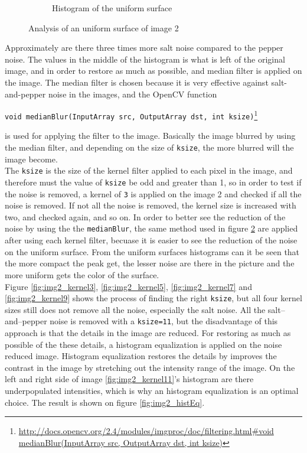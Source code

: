 \begin{figure}[H]
\begin{subfigure}[b]{0.43\textwidth}
        \caption{Histogram of the uniform surface}
        \label{fig:hist_rect_org_img2}
    \end{subfigure}
    \caption{Analysis of an uniform surface of image 2}\label{fig:img2_rect}
\end{figure}

Approximately are there three times more salt noise compared to the pepper noise. The values in the middle of the histogram is what is left of the original image, and in order to restore as much as possible, and median filter is applied on the image. The median filter is chosen because it is very effective against salt-and-pepper noise in the images, and the OpenCV function
\begin{center}
\lstinline|void medianBlur(InputArray src, OutputArray dst, int ksize)|\footnote{\url{http://docs.opencv.org/2.4/modules/imgproc/doc/filtering.html\#void medianBlur(InputArray src, OutputArray dst, int ksize)}}
\end{center}
is used for applying the filter to the image. Basically the image blurred by using the median filter, and depending on the size of \lstinline|ksize|, the more blurred will the image become.\\[0.2cm]
The \lstinline|ksize| is the size of the kernel filter applied to each pixel in the image, and therefore must the value of \lstinline|ksize| be odd and greater than 1, so in order to test if the noise is removed, a kernel of \lstinline|3| is applied on the image 2 and checked if all the noise is removed. If not all the noise is removed, the kernel size is increased with two, and checked again, and so on. In order to better see the reduction of the noise by using the the \lstinline|medianBlur|, the same method used in figure \ref{fig:img2_rect} are applied after using each kernel filter, becuase it is easier to see the reduction of the noise on the uniform surface. From the uniform surfaces histograms can it be seen that the more compact the peak get, the lesser noise are there in the picture and the more uniform gets the color of the surface.\\[0.2cm]
Figure \ref{fig:img2_kernel3}, \ref{fig:img2_kernel5}, \ref{fig:img2_kernel7} and \ref{fig:img2_kernel9} shows the process of finding the right \lstinline|ksize|, but all four kernel sizes still does not remove all the noise, especially the salt noise. All the salt--and--pepper noise is removed with a \lstinline|ksize=11|, but the disadvantage of this approach is that the details in the image are reduced. For restoring as much as possible of the these details, a histogram equalization is applied on the noise reduced image. Histogram equalization restores the details by improves the contrast in the image by stretching out the intensity range of the image. On the left and right side of image \ref{fig:img2_kernel11}'s histogram are there underpopulated intensities, which is why an histogram equalization is an optimal choice. The result is shown on figure \ref{fig:img2_histEq}.

